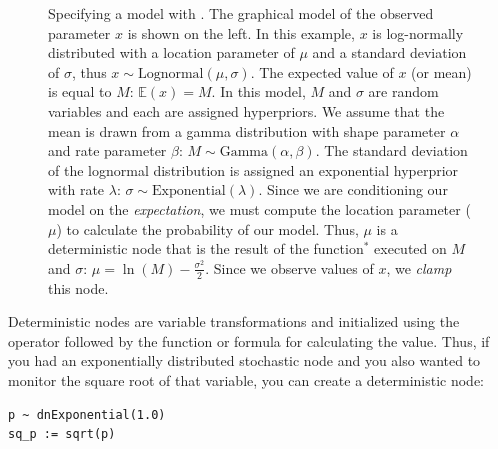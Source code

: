 \begin{figure}[h!]
\centering
{}
\caption{\small Specifying a model with \Rev. 
The graphical model of the observed parameter $x$ is shown on the left. 
In this example, $x$ is log-normally distributed with a location parameter of $\mu$ and a standard deviation of $\sigma$, thus $x \sim \mbox{Lognormal}(\mu, \sigma)$. 
The expected value of $x$ (or mean) is equal to $M$: $\mathbb{E}(x) = M$. 
In this model, $M$ and $\sigma$ are random variables and each are assigned hyperpriors. 
We assume that the mean is drawn from a gamma distribution with shape parameter $\alpha$ and rate parameter $\beta$: $M \sim \mbox{Gamma}(\alpha, \beta)$. 
The standard deviation of the lognormal distribution is assigned an exponential hyperprior with rate $\lambda$: $\sigma \sim \mbox{Exponential}(\lambda)$. 
Since we are conditioning our model on the \emph{expectation}, we must compute the location parameter ($\mu$) to 
calculate the probability of our model. 
Thus, $\mu$ is a deterministic node that is the result of the function$^*$ executed on $M$ and $\sigma$: $\mu = \ln(M) - \frac{\sigma^2}{2}$. 
Since we observe values of $x$, we \emph{clamp} this node.
}
\label{revgmexample}
\end{figure}

Deterministic nodes are variable transformations and initialized using the \cl{:=} operator followed by the function or formula for calculating the value. 
Thus, if you had an exponentially distributed stochastic node and you also wanted to monitor the square root of that variable, you can create a deterministic node:
{\tt \begin{snugshade*}
\begin{lstlisting}
p ~ dnExponential(1.0)
sq_p := sqrt(p)
\end{lstlisting}
\end{snugshade*}}

